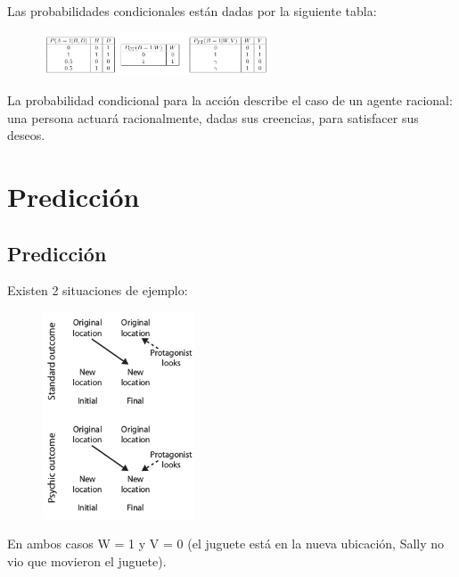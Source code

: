 \documentclass{beamer}
\begin{document}
\begin{frame}
Las probabilidades condicionales están dadas por la siguiente tabla:

\begin{figure}[h!]
  \centering
    \includegraphics[width=0.6\textwidth]{imagenes/probabilidades_condicionales.jpg}
\end{figure}


La probabilidad condicional para la acción describe el caso de un agente racional: una persona actuará racionalmente, dadas sus creencias, para satisfacer sus deseos.
\end{frame}

\section{Predicción}

\subsection{Predicción}
\begin{frame}

Existen 2 situaciones de ejemplo:

\begin{figure}[h!]
  \centering
    \includegraphics[width=0.4\textwidth]{imagenes/situaciones.jpg}
\end{figure}

En ambos casos W = 1 y V = 0 (el juguete está en la nueva ubicación, Sally no vio que movieron el juguete).

\end{frame}
\end{document}
